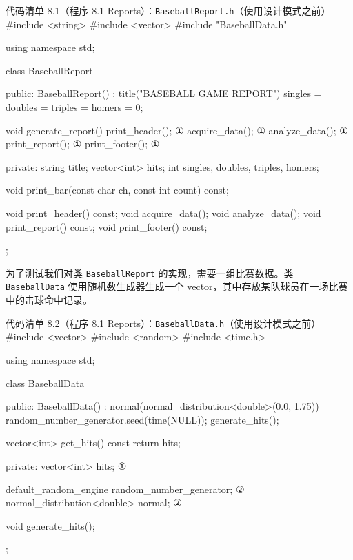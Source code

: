 \begin{codeboxt}{代码清单 8.1（程序 8.1 Reports）：\texttt{Baseball\allowbreak{}Report.\allowbreak{}h}（使用设计模式之前）}
#include <string>
#include <vector>
#include "BaseballData.h"

using namespace std;

class BaseballReport
{
public:
    BaseballReport() : title("BASEBALL GAME REPORT")
    {
        singles = doubles = triples = homers = 0;
    }

    void generate_report()
    {
        print_header();      ①
        acquire_data();      ①
        analyze_data();      ①
        print_report();      ①
        print_footer();      ①
    }

private:
    string title;
    vector<int> hits;
    int singles, doubles, triples, homers;

    void print_bar(const char ch, const int count) const;

    void print_header() const;
    void acquire_data();
    void analyze_data();
    void print_report() const;
    void print_footer() const;
};
\end{codeboxt}
\par

为了测试我们对类 \texttt{Baseball\allowbreak{}Report} 的实现，需要一组比赛数据。类 \texttt{Baseball\allowbreak{}Data} 使用随机数生成器生成一个 vector，其中存放某队球员在一场比赛中的击球命中记录。

\begin{codeboxt}{代码清单 8.2（程序 8.1 Reports）：\texttt{Baseball\allowbreak{}Data.\allowbreak{}h}（使用设计模式之前）}
#include <vector>
#include <random>
#include <time.h>

using namespace std;

class BaseballData
{
public:
    BaseballData()
        : normal(normal_distribution<double>(0.0, 1.75))
    {
        random_number_generator.seed(time(NULL));
        generate_hits();
    }

    vector<int> get_hits() const { return hits; }

private:
    vector<int> hits;                                 ①

    default_random_engine random_number_generator;    ②
    normal_distribution<double> normal;               ②

    void generate_hits();
};
\end{codeboxt}
\par
{}\par

